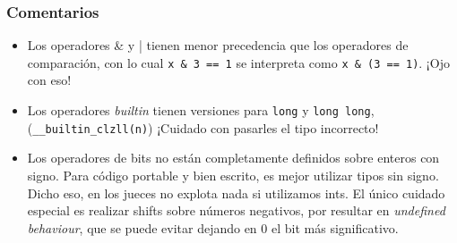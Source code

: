 \subsubsection*{Comentarios}
\begin{itemize}
	\item Los operadores \& y | tienen menor precedencia que los operadores de comparación, con lo cual \lstinline{x & 3 == 1} se interpreta como \lstinline{x & (3 == 1)}. ¡Ojo con eso!
	\item Los operadores \textit{builtin} tienen versiones para \lstinline{long} y \lstinline{long long}, (\lstinline{__builtin_clzll(n)}) ¡Cuidado con pasarles el tipo incorrecto!
	\item Los operadores de bits no están completamente definidos sobre enteros con signo. Para código portable y bien escrito, es mejor utilizar tipos sin signo. Dicho eso, en los jueces no explota nada si utilizamos ints. El único cuidado especial es realizar shifts sobre números negativos, por resultar en \textit{undefined behaviour}, que se puede evitar dejando en $0$ el bit más significativo.
\end{itemize}
